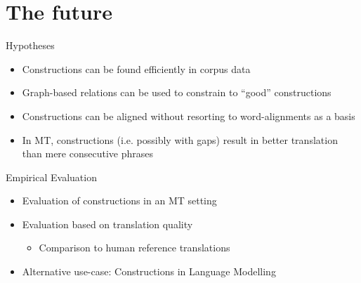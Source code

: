 \documentclass[compress]{beamer}
\begin{document}
\section{The future}

\begin{frame}

	\begin{block}{Hypotheses}
		\begin{itemize}
			\item Constructions can be found efficiently in corpus data
			\item Graph-based relations can be used to constrain to ``good'' constructions
			\item Constructions can be aligned without resorting to word-alignments as a basis
			\item In MT, constructions (i.e. possibly with gaps) result in better translation than mere consecutive phrases
		\end{itemize}
	\end{block}

\end{frame}


\begin{frame}

	\begin{block}{Empirical Evaluation}	
		\begin{itemize}
			\item Evaluation of constructions in an MT setting
			\item Evaluation based on translation quality
			\begin{itemize}
				\item Comparison to human reference translations
			\end{itemize}
			\item Alternative use-case: Constructions in Language Modelling
		\end{itemize}
	\end{block}

\end{frame}
\end{document}
